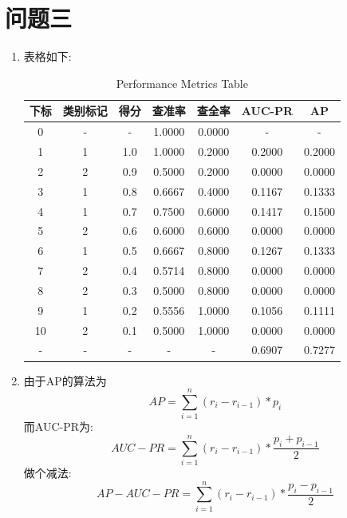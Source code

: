 \documentclass[answers]{exam}  %
\begin{document}
\section{问题三}
\begin{enumerate}[label=\alph*.] 
    \item 表格如下:
    \begin{table}[h]
        \centering
        \caption{Performance Metrics Table}
        \begin{tabular}{c|c|c|c|c|c|c}
            \hline
            下标 & 类别标记 & 得分 & 查准率 & 查全率 & AUC-PR & AP \\
            \hline
            0  & - & -   & 1.0000 & 0.0000 & -      & -      \\
            1  & 1 & 1.0 & 1.0000 & 0.2000 & 0.2000 & 0.2000 \\
            2  & 2 & 0.9 & 0.5000 & 0.2000 & 0.0000 & 0.0000 \\
            3  & 1 & 0.8 & 0.6667 & 0.4000 & 0.1167 & 0.1333 \\
            4  & 1 & 0.7 & 0.7500 & 0.6000 & 0.1417 & 0.1500 \\
            5  & 2 & 0.6 & 0.6000 & 0.6000 & 0.0000 & 0.0000 \\
            6  & 1 & 0.5 & 0.6667 & 0.8000 & 0.1267 & 0.1333 \\
            7  & 2 & 0.4 & 0.5714 & 0.8000 & 0.0000 & 0.0000 \\
            8  & 2 & 0.3 & 0.5000 & 0.8000 & 0.0000 & 0.0000 \\
            9  & 1 & 0.2 & 0.5556 & 1.0000 & 0.1056 & 0.1111 \\
            10 & 2 & 0.1 & 0.5000 & 1.0000 & 0.0000 & 0.0000 \\
            -  & - & -   & -      & -      & 0.6907 & 0.7277 \\
            \hline
        \end{tabular}
    \end{table}
    \item 由于AP的算法为
    \begin{equation*}
        AP = \sum_{i=1}^{n} (r_i - r_{i-1})*p_i
    \end{equation*}
    而AUC-PR为:
    \begin{equation*}
        AUC-PR = \sum_{i=1}^{n} (r_i - r_{i-1})*\frac{p_i+p_{i-1}}{2}
    \end{equation*}
    做个减法:
    \begin{equation*}
        AP -  AUC-PR = \sum_{i=1}^{n} (r_i - r_{i-1})*\frac{p_i - p_{i-1}}{2}

\end{equation*}
\end{enumerate}
\end{document}
